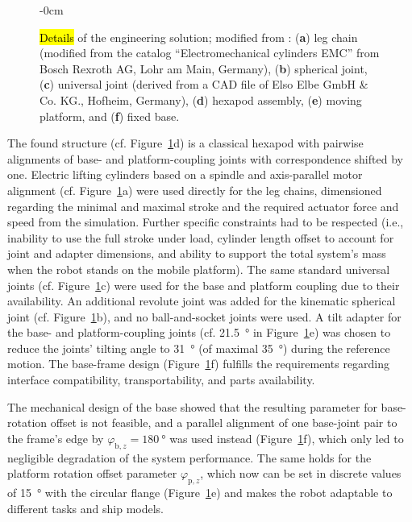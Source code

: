 \vspace{-2pt}
\begin{figure}[H]
\begin{adjustwidth}{-\extralength}{0cm}
  \centering
  \graphicspath{{Figures}}
  
\end{adjustwidth}
\caption{\hl{Details} of the engineering solution; modified from \cite{Fettin2023_M1174}: (\textbf{a}) leg chain (modified from the catalog ``Electromechanical cylinders EMC'' from Bosch Rexroth AG, Lohr am Main, Germany), (\textbf{b}) spherical joint, (\textbf{c}) universal joint (derived from a CAD file of Elso Elbe GmbH \& Co. KG., Hofheim, Germany), (\textbf{d}) hexapod assembly, (\textbf{e}) moving platform, and (\textbf{f}) fixed base.} %
\label{fig:lufipkm_engineering}
\end{figure}

The found structure (cf. Figure~\ref{fig:lufipkm_engineering}d) is a classical hexapod with pairwise alignments of base- and platform-coupling joints with correspondence shifted by one.
%
Electric lifting cylinders based on a spindle and axis-parallel motor alignment  (cf. Figure~\ref{fig:lufipkm_engineering}a) were used directly for the leg chains, dimensioned regarding the minimal and maximal stroke and the required actuator force and speed from the simulation.
Further specific constraints had to be respected (i.e., inability to use the full stroke under load, cylinder length offset to account for joint and adapter dimensions, and ability to support the total system's mass when the robot stands on the mobile platform).
The same standard universal joints (cf. Figure~\ref{fig:lufipkm_engineering}c) were used for the base and platform coupling due to their availability.
An additional revolute joint was added for the kinematic spherical joint (cf. Figure~\ref{fig:lufipkm_engineering}b), and no ball-and-socket joints were used.
%
A tilt adapter for the base- and platform-coupling joints (cf. \SI{21.5}{\degree} in Figure~\ref{fig:lufipkm_engineering}e) was chosen to reduce the joints' tilting angle to \SI{31}{\degree} (of maximal \SI{35}{\degree}) during the reference motion.
The base-frame design (Figure~\ref{fig:lufipkm_engineering}f) fulfills the requirements regarding interface compatibility, transportability, and parts availability.

The mechanical design of the base showed that the resulting parameter for base-rotation offset is not feasible, and a parallel alignment of one base-joint pair to the frame's edge by $\varphi_{\mathrm{b},z}{=}\SI{180}{\degree}$ was used instead (Figure~\ref{fig:lufipkm_engineering}f), which only led to negligible degradation of the system performance.
The same holds for the platform rotation offset parameter $\varphi_{\mathrm{p},z}$, which now can be set in discrete values of \SI{15}{\degree} with the circular flange  (Figure~\ref{fig:lufipkm_engineering}e) and makes the robot adaptable to different tasks and ship models.


